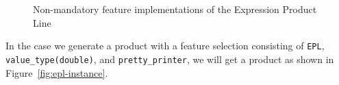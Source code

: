 \begin{figure}[htb]
\label{fig:epl-features}
\caption{Non-mandatory feature implementations of the Expression Product Line}
\end{figure} 

In the case we generate a product with  
a feature selection consisting of 
\texttt{EPL}, \texttt{value\_type(double)}, 
and \texttt{pretty\_printer}, we will get 
a product as shown in Figure~\ref{fig:epl-instance}. 



